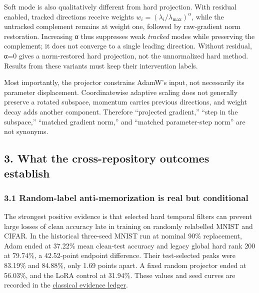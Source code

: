 \documentclass[
  british,
  10pt,
  a4paper,
]{article}
\begin{document}
Soft mode is also qualitatively different from hard
projection.\allowbreak{} With residual enabled, tracked directions
receive weights \(w_i=(\lambda_i/\lambda_{\max})^\alpha\), while the
untracked complement remains at weight one, followed by
raw-\allowbreak{}gradient norm restoration.\allowbreak{} Increasing α
thus suppresses weak \emph{tracked} modes while preserving the
complement; it does not converge to a single leading direction. Without
residual, α=0 gives a norm-\allowbreak{}restored hard
projection,\allowbreak{} not the unnormalized hard method. Results from
these variants must keep their intervention labels.

Most importantly,\allowbreak{} the projector constrains AdamW's input,
not necessarily its parameter displacement\allowbreak{}.\allowbreak{}
Coordinatewise adaptive scaling does not generally preserve a rotated
subspace, momentum carries previous directions,\allowbreak{} and weight
decay adds another component. Therefore ``projected gradient,'' ``step
in the subspace,'' ``matched gradient norm,'' and ``matched
parameter-\allowbreak{}step norm'' are not synonyms.

\subsection{\texorpdfstring{3. What the cross-\allowbreak{}repository
outcomes
establish}{3. What the  outcomes establish}}\label{synthesis--what-the-cross-repository-outcomes-establish}

\subsubsection{\texorpdfstring{3.1 Random-\allowbreak{}label
anti-\allowbreak{}memorization\allowbreak{} is real but
conditional}{3.1   is real but conditional}}\label{synthesis--random-label-anti-memorization-is-real-but-conditional}

The strongest positive evidence is that selected hard temporal filters
can prevent large losses of clean accuracy late in training on randomly
relabelled MNIST and CIFAR. In the historical three-seed MNIST run at
nominal 90\% replacement,\allowbreak{} Adam ended at 37.22\% mean
clean-test accuracy and legacy global hard rank 200 at 79.74\%, a
42.\allowbreak{}52-\allowbreak{}point endpoint difference.\allowbreak{}
Their test-\allowbreak{}selected peaks were 83.19\% and 84.88\%, only
1.69 points apart. A fixed random projector ended at 56.03\%, and the
LoRA control at 31.94\%. These values and seed curves are recorded in
the \href{../analysis/classical-evidence.md}{classical evidence ledger}.
\end{document}
